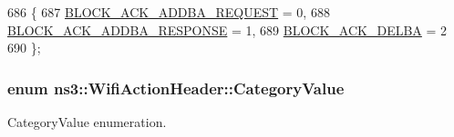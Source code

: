\begin{DoxyCode}
686   \{
687     \hyperlink{classns3_1_1WifiActionHeader_a575d216d28074b8e5fc25d17692f6962aae76baa0c4e02e79e3d69f7d926cc27d}{BLOCK\_ACK\_ADDBA\_REQUEST} = 0,
688     \hyperlink{classns3_1_1WifiActionHeader_a575d216d28074b8e5fc25d17692f6962ac3751303132994172def72465dba6db3}{BLOCK\_ACK\_ADDBA\_RESPONSE} = 1,
689     \hyperlink{classns3_1_1WifiActionHeader_a575d216d28074b8e5fc25d17692f6962a31c45aded50eec5db8f12da960e3d239}{BLOCK\_ACK\_DELBA} = 2
690   \};
\end{DoxyCode}
\subsubsection[{\texorpdfstring{Category\+Value}{CategoryValue}}]{\setlength{\rightskip}{0pt plus 5cm}enum {\bf ns3\+::\+Wifi\+Action\+Header\+::\+Category\+Value}}\hypertarget{classns3_1_1WifiActionHeader_a5402becd11b4077f22d76c4d0d923358}{}\label{classns3_1_1WifiActionHeader_a5402becd11b4077f22d76c4d0d923358}


Category\+Value enumeration. 

